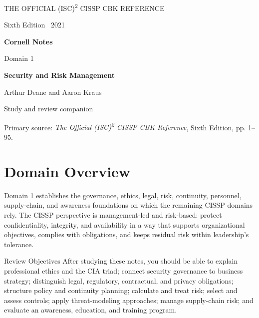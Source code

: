 \documentclass[10pt,letterpaper]{article}
\begin{document}
\hypersetup{pageanchor=false}
\begin{titlepage}
\pagecolor{navy}\color{white}
\vspace*{1.0in}
{\Large THE OFFICIAL (ISC)\textsuperscript{2} CISSP CBK REFERENCE\par}
\vspace{0.25in}
{\large Sixth Edition \textbullet\ 2021\par}
\vfill
{\Huge\bfseries Cornell Notes\par}
\vspace{0.25in}
{\LARGE Domain 1\par}
\vspace{0.08in}
{\LARGE\bfseries Security and Risk Management\par}
\vfill
{\large Arthur Deane and Aaron Kraus\par}
\vspace{0.12in}
{\normalsize Study and review companion\par}
\vspace{0.35in}
{\small Primary source: \textit{The Official (ISC)\textsuperscript{2} CISSP CBK Reference}, Sixth Edition, pp. 1--95.\par}
\end{titlepage}
\hypersetup{pageanchor=true}
\nopagecolor\color{black}

\section*{\color{navy}Domain Overview}
Domain 1 establishes the governance, ethics, legal, risk, continuity, personnel, supply-chain, and awareness foundations on which the remaining CISSP domains rely. The CISSP perspective is management-led and risk-based: protect confidentiality, integrity, and availability in a way that supports organizational objectives, complies with obligations, and keeps residual risk within leadership's tolerance.

\begin{summarybox}{Review Objectives}
After studying these notes, you should be able to explain professional ethics and the CIA triad; connect security governance to business strategy; distinguish legal, regulatory, contractual, and privacy obligations; structure policy and continuity planning; calculate and treat risk; select and assess controls; apply threat-modeling approaches; manage supply-chain risk; and evaluate an awareness, education, and training program.
\end{summarybox}
\end{document}
